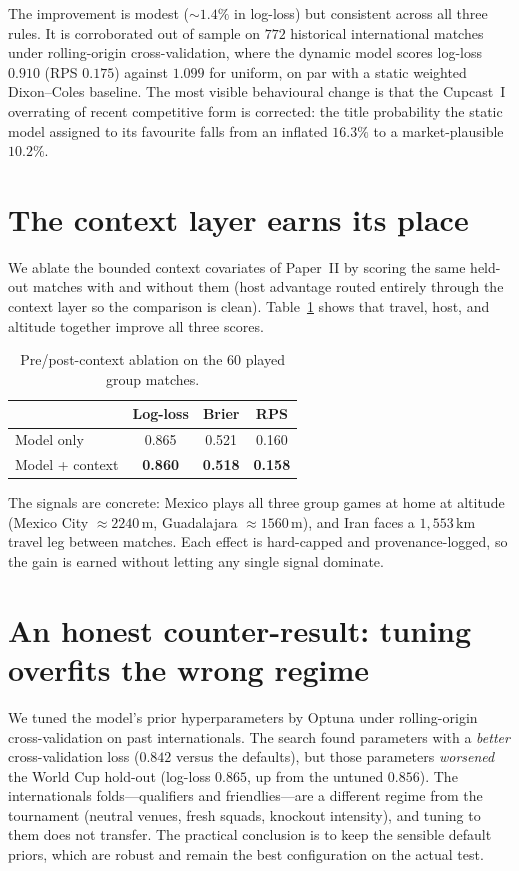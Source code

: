 \documentclass[11pt]{article}
\begin{document}
The improvement is modest ($\sim1.4\%$ in log-loss) but consistent across all
three rules. It is corroborated out of sample on $772$ historical international
matches under rolling-origin cross-validation, where the dynamic model scores
log-loss $0.910$ (RPS $0.175$) against $1.099$ for uniform, on par with a
static weighted Dixon--Coles baseline. The most visible behavioural change is
that the Cupcast~I overrating of recent competitive form is corrected: the title
probability the static model assigned to its favourite falls from an inflated
$16.3\%$ to a market-plausible $10.2\%$.

\section{The context layer earns its place}
We ablate the bounded context covariates of Paper~II by scoring the same
held-out matches with and without them (host advantage routed entirely through
the context layer so the comparison is clean). Table~\ref{tab:ablation} shows
that travel, host, and altitude together improve all three scores.

\begin{table}[h]\centering
\begin{tabular}{lccc}
\toprule
 & Log-loss & Brier & RPS \\
\midrule
Model only            & 0.865 & 0.521 & 0.160 \\
Model + context       & \textbf{0.860} & \textbf{0.518} & \textbf{0.158} \\
\bottomrule
\end{tabular}
\caption{Pre/post-context ablation on the 60 played group matches.}\label{tab:ablation}
\end{table}

The signals are concrete: Mexico plays all three group games at home at altitude
(Mexico City $\approx2240$\,m, Guadalajara $\approx1560$\,m), and Iran faces a
$1{,}553$\,km travel leg between matches. Each effect is hard-capped and
provenance-logged, so the gain is earned without letting any single signal
dominate.

\section{An honest counter-result: tuning overfits the wrong regime}
We tuned the model's prior hyperparameters by Optuna \cite{akiba2019optuna}
under rolling-origin cross-validation on past internationals. The search found
parameters with a \emph{better} cross-validation loss ($0.842$ versus the
defaults), but those parameters \emph{worsened} the World Cup hold-out (log-loss
$0.865$, up from the untuned $0.856$). The internationals folds---qualifiers and
friendlies---are a different regime from the tournament (neutral venues,
fresh squads, knockout intensity), and tuning to them does not transfer.
The practical conclusion is to keep the sensible default priors, which are robust
and remain the best configuration on the actual test.
\end{document}
